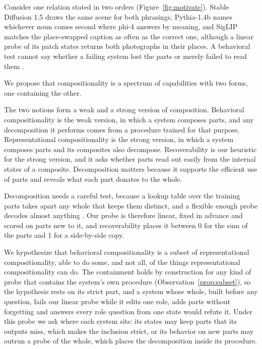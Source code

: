 \documentclass{article}
\theoremstyle{plain}
\theoremstyle{remark}
\begin{document}
Consider one relation stated in two orders (Figure~\ref{fig:motivate}). Stable Diffusion 1.5 draws the same scene for both phrasings, Pythia-1.4b names whichever noun comes second where phi-4 answers by meaning, and SigLIP matches the place-swapped caption as often as the correct one, although a linear probe of its patch states returns both photographs in their places. A behavioral test cannot say whether a failing system lost the parts or merely failed to read them \citep{conwell2022,rassin2022}.

We propose that compositionality is a spectrum of capabilities with two forms, one containing the other.

The two notions form a weak and a strong version of composition. Behavioral compositionality is the weak version, in which a system composes parts, and any decomposition it performs comes from a procedure trained for that purpose. Representational compositionality is the strong version, in which a system composes parts and its composites also decompose. Recoverability is our heuristic for the strong version, and it asks whether parts read out easily from the internal states of a composite. Decomposition matters because it supports the efficient use of parts and reveals what each part donates to the whole.

Decomposition needs a careful test, because a lookup table over the training parts takes apart any whole that keeps them distinct, and a flexible enough probe decodes almost anything \citep{hewitt2019}. Our probe is therefore linear, fixed in advance and scored on parts new to it, and recoverability places it between 0 for the sum of the parts and 1 for a side-by-side copy.

We hypothesize that behavioral compositionality is a subset of representational compositionality, able to do some, and not all, of the things representational compositionality can do. The containment holds by construction for any kind of probe that contains the system's own procedure (Observation~\ref{prop:subset}), so the hypothesis rests on its strict part, and a system whose whole, built before any question, fails our linear probe while it edits one role, adds parts without forgetting and answers every role question from one state would refute it. Under this probe we ask where each system sits: its states may keep parts that its outputs miss, which makes the inclusion strict, or its behavior on new parts may outrun a probe of the whole, which places the decomposition inside its procedure.
\end{document}
